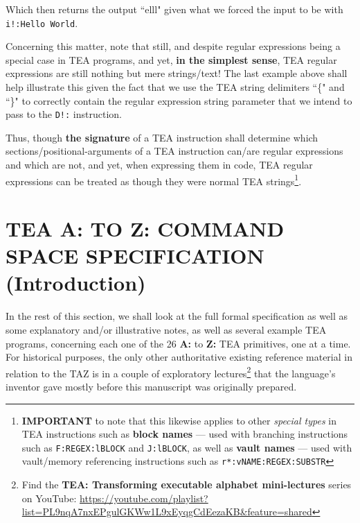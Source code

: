 \documentclass[a4paper, 18pt]{book} %
\begin{document}
Which then returns the output ``elll" given what we forced the input to be with \texttt{i!:Hello World}.

Concerning this matter, note that still, and despite regular expressions being a special case in TEA programs, and yet, \textbf{in the simplest sense}, TEA regular expressions are still nothing but mere strings/text! The last example above shall help illustrate this given the fact that we use the TEA string delimiters ``\{" and ``\}" to correctly contain the regular expression string parameter that we intend to pass to the \texttt{D!:} instruction.

Thus, though \textbf{the signature} of a TEA instruction shall determine which sections/positional-arguments of a TEA instruction can/are regular expressions and which are not, and yet, when expressing them in code, TEA regular expressions can be treated as though they were normal TEA strings\footnote{\textbf{IMPORTANT} to note that this likewise applies to other \textit{special types} in TEA instructions such as \textbf{block names} --- used with branching instructions such as \texttt{F:REGEX:lBLOCK} and \texttt{J:lBLOCK}, as well as \textbf{vault names} --- used with vault/memory referencing instructions such as \texttt{r*:vNAME:REGEX:SUBSTR}}.



\chapter{TEA A: TO Z: COMMAND SPACE SPECIFICATION (Introduction)}
\label{SECTAZ}

In the rest of this section, we shall look at the full formal specification as well as some explanatory and/or illustrative notes, as well as several example TEA programs, concerning each one of the 26 \textbf{A:} to \textbf{Z:} TEA primitives, one at a time. For historical purposes, the only other authoritative existing reference material in relation to the TAZ is in a couple of exploratory lectures\footnote{Find the \textbf{TEA: Transforming executable alphabet mini-lectures} series on YouTube: \url{https://youtube.com/playlist?list=PL9nqA7nxEPgulGKWw1L9xEyqgCdEezaKB&feature=shared}} that the language’s inventor gave mostly before this manuscript was originally prepared.

\end{document}
